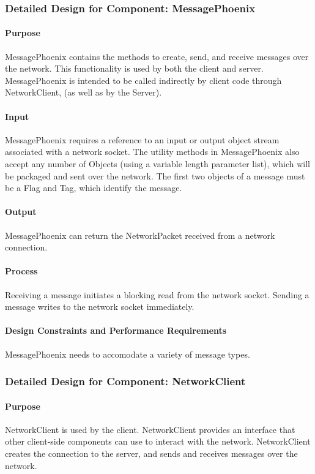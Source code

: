 \documentclass[12pt,a4paper,titlepage]{article}
\begin{document}
\subsubsection{Detailed Design for Component: MessagePhoenix}
\paragraph{Purpose} MessagePhoenix contains the methods to create, send, and receive messages over the network. This functionality is used by both the client and server. MessagePhoenix is intended to be called indirectly by client code through NetworkClient, (as well as by the Server).
\paragraph{Input} MessagePhoenix requires a reference to an input or output object stream associated with a network socket. The utility methods in MessagePhoenix also accept any number of Objects (using a variable length parameter list), which will be packaged and sent over the network. The first two objects of a message must be a Flag and Tag, which identify the message. 
\paragraph{Output} MessagePhoenix can return the NetworkPacket received from a network connection. 
\paragraph{Process} Receiving a message initiates a blocking read from the network socket. Sending a message writes to the network socket immediately. 
\paragraph{Design Constraints and Performance Requirements} MessagePhoenix needs to accomodate a variety of message types. 

\subsubsection{Detailed Design for Component: NetworkClient }
\paragraph{Purpose} NetworkClient is used by the client. NetworkClient provides an interface that other client-side components can use to interact with the network. NetworkClient creates the connection to the server, and sends and receives messages over the network.
\end{document}

